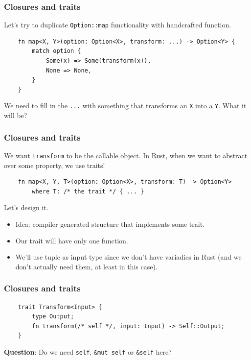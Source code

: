 \documentclass[aspectratio=1610,t]{beamer}
\begin{document}

\begin{frame}[fragile]
\frametitle{Closures and traits}
Let's try to duplicate \texttt{Option::map} functionality with handcrafted function.

\begin{verbatim}
    fn map<X, Y>(option: Option<X>, transform: ...) -> Option<Y> {
        match option {
            Some(x) => Some(transform(x)),
            None => None,
        }
    }
\end{verbatim}

We need to fill in the \texttt{...} with something that transforms an \texttt{X} into a \texttt{Y}. What it will be?
\end{frame}


\begin{frame}[fragile]
\frametitle{Closures and traits}
We want \texttt{transform} to be the callable object. In Rust, when we want to abstract over some property, we use traits!

\begin{verbatim}
    fn map<X, Y, T>(option: Option<X>, transform: T) -> Option<Y>
        where T: /* the trait */ { ... }
\end{verbatim}

Let's design it.

\begin{itemize}
    \item<2-> Idea: compiler generated structure that implements some trait.
    \item<3-> Our trait will have only one function.
    \item<4-> We'll use tuple as input type since we don't have variadics in Rust (and we don't actually need them, at least in this case).
\end{itemize}
\end{frame}


\begin{frame}[fragile]
\frametitle{Closures and traits}
\begin{verbatim}
    trait Transform<Input> {
        type Output;
        fn transform(/* self */, input: Input) -> Self::Output;
    }
\end{verbatim}

\textbf{Question}: Do we need \texttt{self}, \texttt{\&mut self} or \texttt{\&self} here?

\end{frame}
\end{document}
